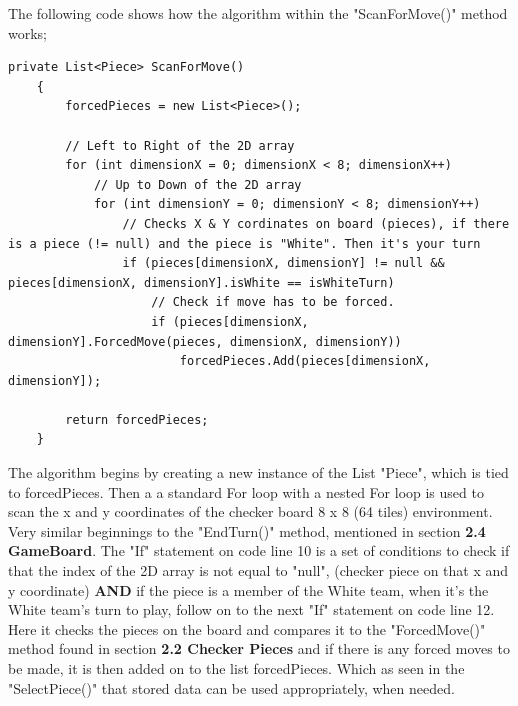 \documentclass[10pt, a4paper]{article}
\begin{document}
	 The following code shows how the algorithm within the "ScanForMove()" method works;
	 \begin{lstlisting}[caption = ScanForMove()]
	 private List<Piece> ScanForMove()
    {
        forcedPieces = new List<Piece>();

        // Left to Right of the 2D array
        for (int dimensionX = 0; dimensionX < 8; dimensionX++)
            // Up to Down of the 2D array
            for (int dimensionY = 0; dimensionY < 8; dimensionY++)
                // Checks X & Y cordinates on board (pieces), if there is a piece (!= null) and the piece is "White". Then it's your turn
                if (pieces[dimensionX, dimensionY] != null && pieces[dimensionX, dimensionY].isWhite == isWhiteTurn)
                    // Check if move has to be forced.
                    if (pieces[dimensionX, dimensionY].ForcedMove(pieces, dimensionX, dimensionY))
                        forcedPieces.Add(pieces[dimensionX, dimensionY]);

        return forcedPieces;
    }
	 \end{lstlisting}
	 The algorithm begins by creating a new instance of the List "Piece", which is tied to forcedPieces. Then a a standard For loop with a nested For loop is used to scan the x and y coordinates of the checker board 8 x 8 (64 tiles) environment. Very similar beginnings to the "EndTurn()" method, mentioned in section \textbf{2.4 GameBoard}. The "If" statement on code line 10 is a set of conditions to check if that the index of the 2D array is not equal to "null", (checker piece on that x and y coordinate) \textbf{AND} if the piece is a member of the White team, when it's the White team's turn to play, follow on to the next "If" statement on code line 12. Here it checks the pieces on the board and compares it to the "ForcedMove()" method found in section \textbf{2.2 Checker Pieces} and if there is any  forced moves to be made, it is then added on to the list forcedPieces. Which as seen in the "SelectPiece()" that stored data can be used appropriately, when needed.
	 
\end{document}
